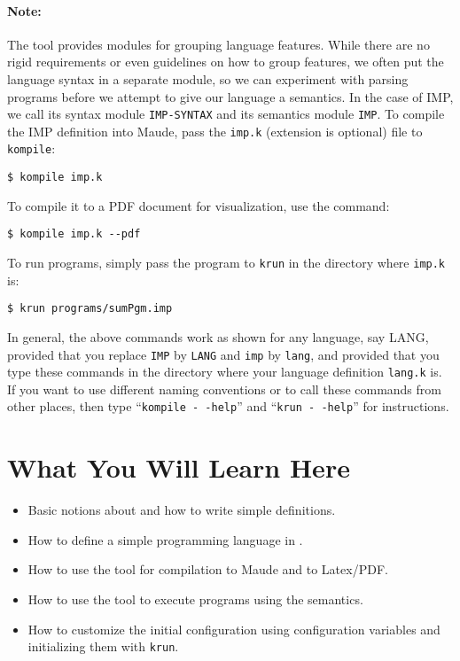 \begin{latexComment}
\paragraph{Note:}{
The \K tool provides modules for grouping language features.  While
there are no rigid requirements or even guidelines on how to group
features, we often put the language syntax in a separate module, so we
can experiment with parsing programs before we attempt to give our
language a semantics.  In the case of IMP, we call its syntax module
\texttt{IMP-SYNTAX} and its semantics module \texttt{IMP}.  To compile
the IMP definition into Maude, pass the \texttt{imp.k}
(extension is optional) file to \texttt{kompile}:
\begin{verbatim}
$ kompile imp.k
\end{verbatim}
To compile it to a PDF document for visualization, use the command:
\begin{verbatim}
$ kompile imp.k --pdf
\end{verbatim}
To run programs, simply pass the program to \texttt{krun} in the
directory where \texttt{imp.k} is:
\begin{verbatim}
$ krun programs/sumPgm.imp
\end{verbatim}
In general, the above commands work as shown for any language, say
LANG, provided that you replace \texttt{IMP} by \texttt{LANG} and
\texttt{imp} by \texttt{lang}, and provided that you type these
commands in the directory where your language definition
\texttt{lang.k} is.  If you want to use different naming
conventions or to call these commands from other places, then type
``\texttt{kompile -\,\!-help}'' and ``\texttt{krun -\,\!-help}'' for
instructions.
}

\section{What You Will Learn Here}

\begin{itemize}
\item Basic notions about \K and how to write simple \K definitions.
\item How to define a simple programming language in \K.
\item How to use the \K tool for compilation to Maude and to Latex/PDF.
\item How to use the \K tool to execute programs using the semantics.
\item How to customize the initial configuration using configuration
variables and initializing them with \texttt{krun}.
\end{itemize}

\end{latexComment}

\vspace*{3ex}
